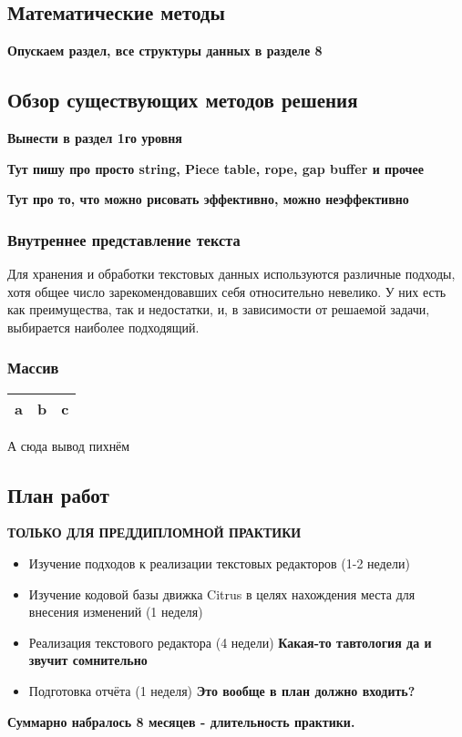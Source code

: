 \documentclass{fefu}
\begin{document}
		\subsection{Математические методы}
			\textbf{Опускаем раздел, все структуры данных в разделе 8}	
		\subsection{Обзор существующих методов решения}
			\textbf{Вынести в раздел 1го уровня}
			\par \textbf{Тут пишу про просто string, Piece table, rope, gap buffer и прочее}
			\par \textbf{Тут про то, что можно рисовать эффективно, можно неэффективно}
			\subsubsection{Внутреннее представление текста}
				\par Для хранения и обработки текстовых данных используются различные подходы,
				хотя общее число зарекомендовавших себя относительно невелико.
				У них есть как преимущества, так и недостатки, и, в зависимости от решаемой
				задачи, выбирается наиболее подходящий.
				\subsubsection*{Массив}

			\begin{center}
				\begin{tabular}{ |l|c|r|}
					\hline
					a & b & c \\
					\hline
				\end{tabular}
			\end{center}
			\par А сюда вывод пихнём
		\subsection{План работ}
			\par \textbf{ТОЛЬКО ДЛЯ ПРЕДДИПЛОМНОЙ ПРАКТИКИ}
			\begin{itemize}
				\item Изучение подходов к реализации текстовых редакторов (1-2 недели)
				\item Изучение кодовой базы движка Citrus в целях нахождения места для внесения
				изменений (1 неделя)
				\item Реализация текстового редактора (4 недели) \textbf{Какая-то тавтология 
				да и звучит сомнительно}
				\item Подготовка отчёта (1 неделя) \textbf{Это вообще в план должно входить?}
			\end{itemize}
			\textbf{Суммарно набралось 8 месяцев - длительность практики.}
\end{document}
